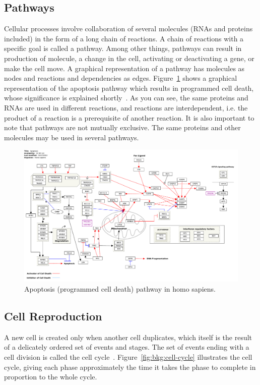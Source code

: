 \subsection{Pathways}
Cellular processes involve collaboration of several molecules (RNAs and proteins included) in the form of a long chain of reactions. A chain of reactions with a specific goal is called a pathway. Among other things, pathways can result in production of molecule, a change in the cell, activating or deactivating a gene, or make the cell move. A graphical representation of a pathway has molecules as nodes and reactions and dependencies as edges. Figure~\ref{fig:bkg:apoptosis-pathway} shows a graphical representation of the apoptosis pathway which results in programmed cell death, whose significance is explained shortly~\cite{bose2007p53, mott2007mir, lakin1999regulation, xiong2010effects, park2009mir}. As you can see, the same proteins and RNAs are used in different reactions, and reactions are interdependent, i.e. the product of a reaction is a prerequisite of another reaction. It is also important to note that pathways are not mutually exclusive. The same proteins and other molecules may be used in several pathways.

\begin{figure}[!ht]
  \centering
  \includegraphics[width=1\textwidth]{figs/background/apoptosis-pathway}
  \caption{Apoptosis (programmed cell death) pathway in homo sapiens.\protect\footnotemark}
  \label{fig:bkg:apoptosis-pathway}
\end{figure}

\subsection{Cell Reproduction}
A new cell is created only when another cell duplicates, which itself is the result of a delicately ordered set of events and stages. The set of events ending with a cell division is called the cell cycle~\cite[Ch. 17]{the-cell}. Figure~\ref{fig:bkg:cell-cycle} illustrates the cell cycle, giving each phase approximately the time it takes the phase to complete in proportion to the whole cycle. 

